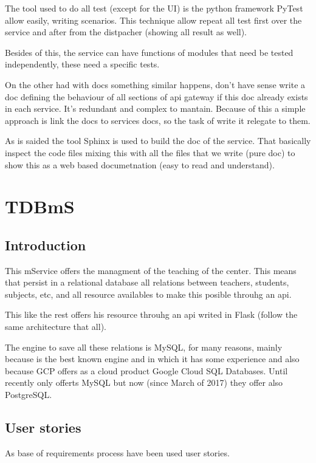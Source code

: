 \documentclass[oneside,english,titlepage]{scrbook}
\begin{document}
The tool used to do all test (except for the UI) is the python framework
PyTest allow easily, writing scenarios. This technique allow repeat
all test first over the service and after from the distpacher (showing
all result as well).

Besides of this, the service can have functions of modules that need
be tested independently, these need a specific tests.

\bigskip

On the other had with docs something similar happens, don't have sense
write a doc defining the behaviour of all sections of api gateway
if this doc already exists in each service. It's redundant and complex
to mantain. Because of this a simple approach is link the docs to
services docs, so the task of write it relegate to them.

As is saided the tool Sphinx is used to build the doc of the service.
That basically inspect the code files mixing this with all the files
that we write (pure doc) to show this as a web based documetnation
(easy to read and understand).

\section{TDBmS}

\subsection{Introduction}

This mService offers the managment of the teaching of the center.
This means that persist in a relational database all relations between
teachers, students, subjects, etc, and all resource availables to
make this posible throuhg an api.\bigskip

This like the rest offers his resource throuhg an api writed in Flask
(follow the same architecture that all).

The engine to save all these relations is MySQL, for many reasons,
mainly because is the best known engine and in which it has some experience
and also because GCP offers as a cloud product Google Cloud SQL Databases.
Until recently only offerts MySQL but now (since March of 2017) they
offer also PostgreSQL.

\subsection{User stories}

As base of requirements process have been used user stories.
\end{document}
